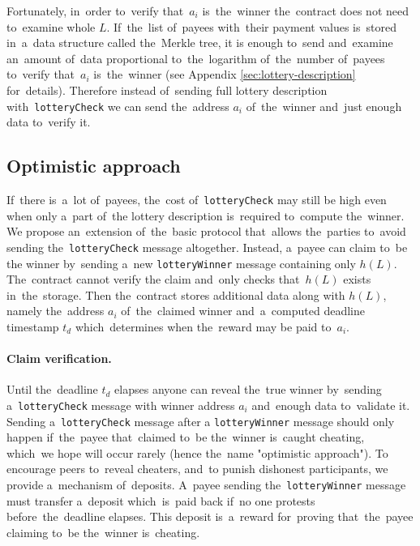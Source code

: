 \documentclass[a4paper]{article}
\begin{document}
    Fortunately, in~order to~verify that~$a_i$ is~the~winner the~contract does not need to~examine whole $L$.
    If~the~list of~payees with~their payment values is~stored in~a~data structure called the~Merkle tree, it is
    enough to~send and~examine an~amount of~data proportional to~the~logarithm of~the~number of~payees to~verify
    that~$a_i$ is~the~winner (see Appendix \ref{sec:lottery-description} for~details). Therefore instead of~sending
    full lottery description with~\texttt{lotteryCheck} we can send the~address $a_i$ of~the~winner and~just enough
    data to~verify it.

\subsection{Optimistic approach}
    If~there is~a~lot of~payees, the~cost of~\texttt{lotteryCheck} may still be high even when only a~part of~the
    lottery description is~required to~compute the~winner. We propose an~extension of~the~basic protocol that~allows
    the~parties to~avoid sending the~\texttt{lotteryCheck} message altogether. Instead, a~payee can claim to~be the
    winner by~sending a~new \texttt{lotteryWinner} message containing only $h(L)$. The~contract cannot verify the
    claim and~only checks that~$h(L)$ exists in~the~storage. Then the~contract stores additional data along with
    $h(L)$, namely the~address $a_i$ of~the~claimed winner and~a~computed deadline timestamp $t_d$ which~determines
    when the~reward may be paid to~$a_i$.

    \paragraph{Claim verification.}
    Until the~deadline $t_d$ elapses anyone can reveal the~true winner by~sending a~\texttt{lotteryCheck} message with
    winner address $a_i$ and~enough data to~validate it. Sending a~\texttt{lotteryCheck} message after a
    \texttt{lotteryWinner} message should only happen if~the~payee that~claimed to~be the~winner is~caught cheating,
    which~we hope will occur rarely (hence the~name "optimistic approach"). To encourage peers to~reveal cheaters,
    and~to punish dishonest participants, we provide a~mechanism of~deposits. A~payee sending the~\texttt{lotteryWinner}
    message must transfer a~deposit which~is~paid back if~no one protests before~the~deadline elapses.
    This deposit is~a~reward for~proving that~the~payee claiming to~be the~winner is~cheating.
\end{document}
